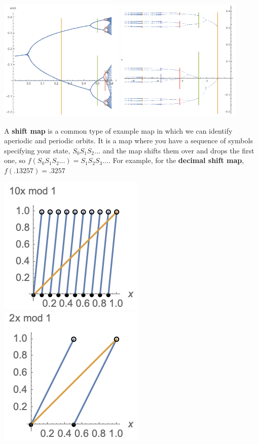 \documentclass[12pt,letterpaper,noanswers]{exam}
\begin{document}
\includegraphics[width=0.45\textwidth]{img/191111-C28p1a.png}
\includegraphics[width=0.45\textwidth]{img/191111-C28p1b.png}



\begin{tcolorbox}
A \textbf{shift map} is a common type of example map in which we can identify aperiodic and periodic orbits.  It is a map where you have a sequence of symbols specifying your state, $S_0S_1S_2...$ and the map shifts them over and drops the first one, so $f(S_0S_1S_2...)=S_1S_2S_3...$.  For example, for the \textbf{decimal shift map}, $f(.13257) = .3257$ 

\end{tcolorbox}

\includegraphics[scale=0.8]{img/C26shift10p1.png}
\includegraphics[scale=0.8]{img/C26shift2p2.png}
\end{document}
